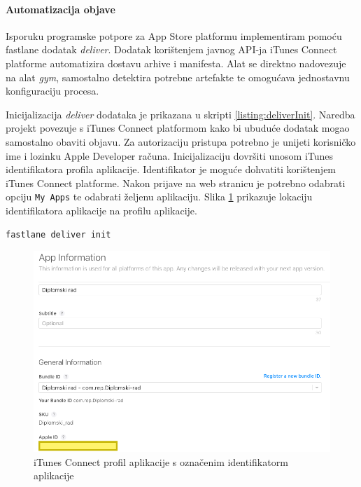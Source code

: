\documentclass[times, utf8, diplomski, numeric]{fer}
\begin{document}
\paragraph{Automatizacija objave}

Isporuku programske potpore za App Store platformu implementiram pomoću fastlane dodatak \textit{deliver}\citep{fastlane:deliver}. Dodatak korištenjem javnog API-ja iTunes Connect platforme automatizira dostavu arhive i manifesta. Alat se direktno nadovezuje na alat \textit{gym}, samostalno detektira potrebne artefakte te omogućava jednostavnu konfiguraciju procesa.

Inicijalizacija \textit{deliver} dodataka je prikazana u skripti \ref{listing:deliverInit}. Naredba projekt povezuje s iTunes Connect platformom kako bi ubuduće dodatak mogao samostalno obaviti objavu. Za autorizaciju pristupa potrebno je unijeti korisničko ime i lozinku Apple Developer računa. Inicijalizaciju dovršiti unosom iTunes identifikatora profila aplikacije. Identifikator je moguće dohvatiti korištenjem iTunes Connect platforme. Nakon prijave na web stranicu  je potrebno odabrati opciju \verb|My Apps| te odabrati željenu aplikaciju. Slika \ref{fig:iTunesConnectAppId} prikazuje lokaciju identifikatora aplikacije na profilu aplikacije.

\begin{lstlisting}[caption=Inicijalizacija deliver dodatka, label=listing:deliverInit]
fastlane deliver init
\end{lstlisting}

\begin{figure}
\centering
\includegraphics[scale=0.45]{iTunesConnectAppId}
\caption{iTunes Connect profil aplikacije s označenim identifikatorm aplikacije}
\label{fig:iTunesConnectAppId}
\end{figure}
\end{document}
